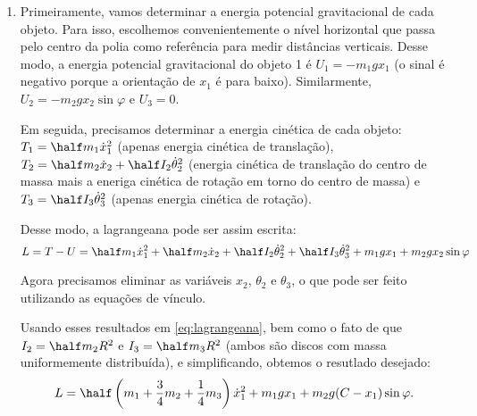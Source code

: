 \begin{question}
	\begin{solution}
		\begin{enumerate}
			\item Primeiramente, vamos determinar a energia potencial gravitacional de cada objeto.
			Para isso, escolhemos convenientemente o nível horizontal que passa pelo centro da polia como referência para medir distâncias verticais.
			Desse modo, a energia potencial gravitacional do objeto 1 é $U_1 = -m_1gx_1$ (o sinal é negativo porque a orientação de $x_1$ é para baixo).
			Similarmente, $U_2 = -m_2gx_2\sin\varphi$ e $U_3 = 0$.

			Em seguida, precisamos determinar a energia cinética de cada objeto: $T_1 = \half m_1 \dot x_1^2$ (apenas energia cinética de translação), $T_2 = \half m_2 \dot x_2 + \half I_2 \dot\theta_2^2$ (energia cinética de translação do centro de massa mais a eneriga cinética de rotação em torno do centro de massa) e $T_3 = \half I_3 \dot\theta_3^2$ (apenas energia cinética de rotação).

			Desse modo, a lagrangeana pode ser assim escrita:
			\begin{equation}\label{eq:lagrangeana}
				L = T - U = \half m_1 \dot x_1^2 + \half m_2 \dot x_2 + \half I_2 \dot\theta_2^2 + \half I_3 \dot\theta_3^2 + m_1gx_1 + m_2gx_2\sin\varphi
			\end{equation}

			Agora precisamos eliminar as variáveis $x_2$, $\theta_2$ e $\theta_3$, o que pode ser feito utilizando as equações de vínculo.

			Usando esses resultados em \eqref{eq:lagrangeana}, bem como o fato de que $I_2 = \half m_2 R^2$ e $I_3 = \half m_3 R^2$ (ambos são discos com massa uniformemente distribuída), e simplificando, obtemos o resutlado desejado:
			\begin{equation*}
				L = \half\left(m_1 + \frac{3}{4}m_2 + \frac{1}{4}m_3\right)\dot x_1^2 + m_1 g x_1 + m_2 g (C - x_1) \sin\varphi.
			\end{equation*}


\end{enumerate}
\end{solution}
\end{question}
